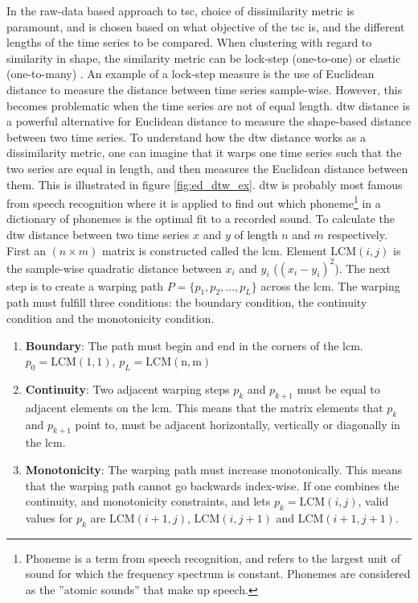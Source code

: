 In the raw-data based approach to \acrshort{tsc}, choice of dissimilarity metric is paramount, and is chosen based on what objective of the \acrshort{tsc} is, and the different lengths of the time series to be compared. When clustering with regard to similarity in shape, the similarity metric can be lock-step (one-to-one) or elastic (one-to-many) \cite{tsc_rev}. An example of a lock-step measure is the use of Euclidean distance to measure the distance between time series sample-wise. However, this becomes problematic when the time series are not of equal length. \acrfull{dtw} distance is a powerful alternative for Euclidean distance to measure the shape-based distance between two time series. To understand how the \acrshort{dtw} distance works as a dissimilarity metric, one can imagine that it warps one time series such that the two series are equal in length, and then measures the Euclidean distance between them. This is illustrated in figure \ref{fig:ed_dtw_ex}. \acrshort{dtw} is probably most famous from speech recognition where it is applied to find out which phoneme\footnote{Phoneme is a term from speech recognition, and refers to the largest unit of sound for which the frequency spectrum is constant. Phonemes are considered as the ''atomic sounds'' that make up speech.} in a dictionary of phonemes is the optimal fit to a recorded sound. To calculate the \acrshort{dtw} distance between two time series $x$ and $y$ of length $n$ and $m$ respectively. First an $(n \times m)$ matrix is constructed called the \acrfull{lcm}. Element $\mathrm{LCM}(i,j)$ is the sample-wise quadratic distance between $x_i$ and $y_i$ ($(x_i - y_i)^2$). The next step is to create a warping path $P = \{p_1, p_2, ..., p_L\}$ across the \acrshort{lcm}. The warping path must fulfill three conditions: the boundary condition, the continuity condition and the monotonicity condition. 

\begin{enumerate} 
    \item \textbf{Boundary}: The path must begin and end in the corners of the \acrshort{lcm}. $p_0 = \mathrm{LCM(1,1)}$, $p_L = \mathrm{LCM(n,m)}$ 
    \item \textbf{Continuity}: Two adjacent warping steps $p_k$ and $p_{k+1}$ must be equal to adjacent elements on the \acrshort{lcm}. This means that the matrix elements that $p_k$ and $p_{k+1}$ point to, must be adjacent horizontally, vertically or diagonally in the \acrshort{lcm}.
    \item \textbf{Monotonicity}: The warping path must increase monotonically. This means that the warping path cannot go backwards index-wise. If one combines the continuity, and monotonicity constraints, and lets $p_k = \mathrm{LCM}(i,j)$, valid values for $p_k$ are $\mathrm{LCM}(i+1,j)$, $\mathrm{LCM}(i,j+1)$ and $\mathrm{LCM}(i+1,j+1)$.
\end{enumerate}

